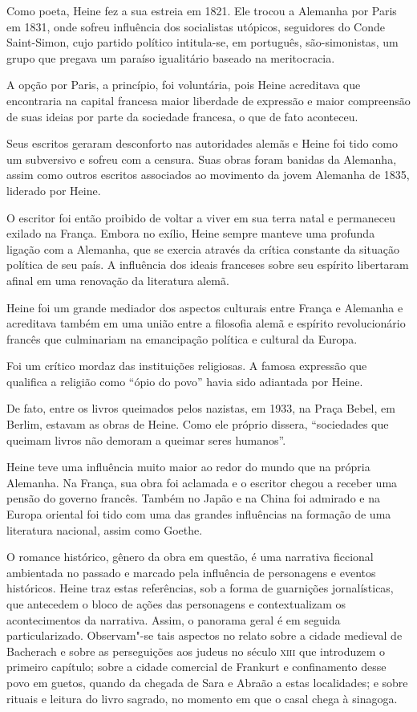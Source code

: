 \documentclass[12pt]{extarticle}
\begin{document}
Como poeta, Heine fez a sua estreia em 1821. Ele trocou a Alemanha 
por Paris em 1831, onde sofreu influência dos socialistas 
utópicos, seguidores do Conde Saint-Simon, cujo partido político 
intitula-se, em português, são-simonistas, um grupo que pregava 
um paraíso igualitário baseado na meritocracia.

A opção por Paris, a princípio, foi voluntária, pois Heine 
acreditava que encontraria na capital francesa maior 
liberdade de expressão e maior compreensão de suas ideias 
por parte da sociedade francesa, o que de fato aconteceu.

Seus escritos geraram desconforto nas autoridades alemãs e 
Heine foi tido como um subversivo e sofreu com a censura. 
Suas obras foram banidas da Alemanha, assim como outros 
escritos associados ao movimento da jovem Alemanha de 1835, liderado por Heine. 

O escritor foi então proibido de voltar a viver em sua terra natal e 
permaneceu exilado na França. Embora no exílio, Heine sempre 
manteve uma profunda ligação com a Alemanha, que se 
exercia através da crítica constante da situação política 
de seu país. A influência dos ideais franceses sobre seu 
espírito libertaram afinal em uma renovação da literatura alemã.

Heine foi um grande mediador dos aspectos culturais entre 
França e Alemanha e acreditava também em uma união entre 
a filosofia alemã e espírito revolucionário francês 
que culminariam na emancipação política e cultural da Europa.

Foi um crítico mordaz das instituições religiosas. 
A famosa expressão que qualifica a religião 
como ``ópio do povo'' havia sido adiantada por Heine. 

De fato, entre os livros queimados pelos nazistas, em 
1933, na Praça Bebel, em Berlim, estavam as obras 
de Heine. Como ele próprio dissera, ``sociedades 
que queimam livros não demoram a queimar seres humanos''.

Heine teve uma influência muito maior ao redor do 
mundo que na própria Alemanha. Na França, sua obra foi 
aclamada e o escritor chegou a receber uma pensão 
do governo francês. Também no Japão e na China 
foi admirado e na Europa oriental foi tido com uma 
das grandes influências na formação de uma literatura nacional, assim como Goethe.

O romance histórico, gênero da obra em questão, é 
uma narrativa ficcional ambientada no passado 
e marcado pela influência de personagens e eventos históricos. 
Heine traz estas referências, sob a forma de guarnições jornalísticas,
que antecedem o bloco de ações das personagens e contextualizam os
acontecimentos da narrativa. Assim, o panorama geral é em seguida
particularizado. Observam"-se tais aspectos no relato sobre a cidade
medieval de Bacherach e sobre as perseguições aos judeus no século \textsc{xiii}
que introduzem o primeiro capítulo; sobre a cidade comercial de Frankurt
e confinamento desse povo em guetos, quando da chegada de Sara e Abraão
a estas localidades; e sobre rituais e leitura do livro sagrado, no
momento em que o casal chega à sinagoga.
\end{document}
